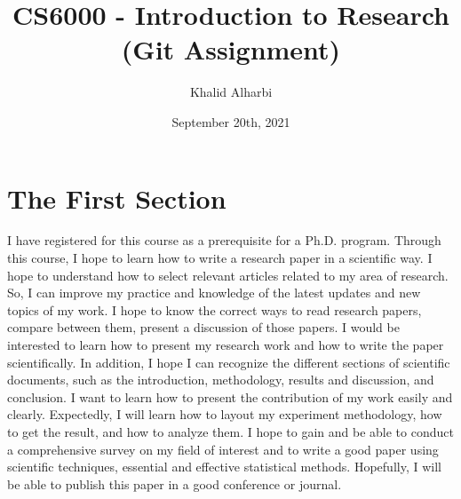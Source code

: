 \documentclass[11pt]{article}
\title{CS6000 - Introduction to Research (Git Assignment)}
\author{Khalid Alharbi}
\date{September 20th, 2021}
\begin{document}
\maketitle

\section{The First Section}

I have registered for this course as a prerequisite for a Ph.D. program. Through this course, I hope to learn how to write a research paper in a scientific way.  I hope to understand how to select relevant articles related to my area of research. So, I can improve my practice and knowledge of the latest updates and new topics of my work. I hope to know the correct ways to read research papers, compare between them, present a discussion of those papers. I would be interested to learn how to present my research work and how to write the paper scientifically. In addition, I hope I can recognize the different sections of scientific documents, such as the introduction, methodology,  results and discussion, and conclusion.  I want to learn how to present the contribution of my work easily and clearly. Expectedly, I will learn how to layout my experiment methodology, how to get the result, and how to analyze them. I hope to gain and be able to conduct a comprehensive survey on my field of interest and to write a good paper using scientific techniques, essential and effective statistical methods. Hopefully, I will be able to publish this paper in a good conference or journal. 
\end{document}
